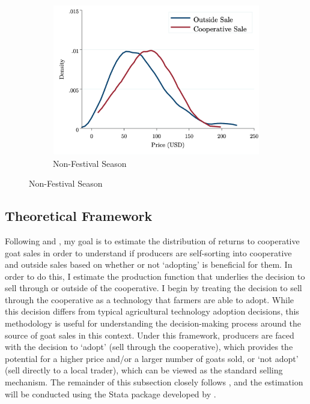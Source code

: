 \documentclass[11pt]{article}
\begin{document}
\begin{figure}[H]
\begin{subfigure}[t]{0.49\textwidth}
    \end{subfigure}
    \hfill
    \begin{subfigure}[t]{0.49\textwidth}
        \centering
        \caption{Non-Festival Season} \label{figure:E2_PD_NonFest}
        \includegraphics[width=\linewidth,trim=4 4 4 4,clip]{E2_PriceDensity_NonFest.png} 
    \end{subfigure}
\end{figure}


\subsection{Theoretical Framework} \label{sec:E2_theory}
Following \citet{michler-et.al.18} and \citet{suri11}, my goal is to estimate the distribution of returns to cooperative goat sales in order to understand if producers are self-sorting into cooperative and outside sales based on whether or not `adopting' is beneficial for them. In order to do this, I estimate the production function that underlies the decision to sell through or outside of the cooperative. I begin by treating the decision to sell through the cooperative as a technology that farmers are able to adopt. While this decision differs from typical agricultural technology adoption decisions, this methodology is useful for understanding the decision-making process around the source of goat sales in this context. Under this framework, producers are faced with the decision to `adopt' (sell through the cooperative), which provides the potential for a higher price and/or a larger number of goats sold, or `not adopt' (sell directly to a local trader), which can be viewed as the standard selling mechanism. The remainder of this subsection closely follows \citet{michler-et.al.18}, and the estimation will be conducted using the Stata package developed by \citet{cabanillas-et.al.18}.
\end{document}
